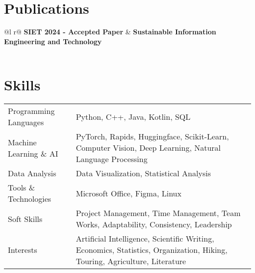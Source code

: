 \documentclass[a4paper,12pt]{article}
\begin{document}
\section{Publications}
\begin{tabularx}{\linewidth}{ @{}l r@{} }
\textbf{SIET 2024 - Accepted Paper} & \hfill \textbf{Sustainable Information Engineering and Technology} \\[3.75pt]
  \\
\end{tabularx}


\section{Skills}
\begin{tabularx}{\linewidth}{@{}l X@{}}
Programming Languages &  \normalsize{Python, C++, Java, Kotlin, SQL}\\
Machine Learning \& AI  &  \normalsize{PyTorch, Rapids, Huggingface, Scikit-Learn, Computer Vision, Deep Learning, Natural Language Processing}\\  
Data Analysis &  \normalsize{Data Visualization, Statistical Analysis}\\
Tools \& Technologies &  \normalsize{Microsoft Office, Figma, Linux}\\
Soft Skills &  \normalsize{Project Management, Time Management, Team Works, Adaptability, Consistency, Leadership}\\
Interests &  \normalsize{Artificial Intelligence, Scientific Writing, Economics, Statistics, Organization, Hiking, Touring, Agriculture, Literature}\\
\end{tabularx}

\vfill
{}
\end{document}
